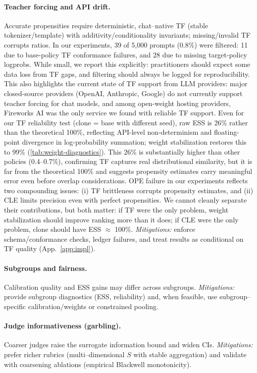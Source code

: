 \paragraph{Teacher forcing and API drift.}
Accurate propensities require deterministic, chat–native TF (stable tokenizer/template) with additivity/conditionality invariants; missing/invalid TF corrupts ratios.
In our experiments, 39 of 5,000 prompts (0.8\%) were filtered: 11 due to base-policy TF conformance failures, and 28 due to missing target-policy logprobs. While small, we report this explicitly: practitioners should expect some data loss from TF gaps, and filtering should always be logged for reproducibility. This also highlights the current state of TF support from LLM providers: major closed-source providers (OpenAI, Anthropic, Google) do not currently support teacher forcing for chat models, and among open-weight hosting providers, Fireworks AI was the only service we found with reliable TF support.
Even for our TF reliability test (clone = base with different seed), raw ESS is 26\% rather than the theoretical 100\%, reflecting API-level non-determinism and floating-point divergence in log-probability summation; weight stabilization restores this to 99\% (\cref{tab:weight-diagnostics}). This 26\% is substantially higher than other policies (0.4--0.7\%), confirming TF captures real distributional similarity, but it is far from the theoretical 100\% and suggests propensity estimates carry meaningful error even before overlap considerations.
OPE failure in our experiments reflects two compounding issues: (i) TF brittleness corrupts propensity estimates, and (ii) CLE limits precision even with perfect propensities. We cannot cleanly separate their contributions, but both matter: if TF were the only problem, weight stabilization should improve ranking more than it does; if CLE were the only problem, clone should have ESS $\approx$ 100\%.
\emph{Mitigations:} enforce schema/conformance checks, ledger failures, and treat results as conditional on TF quality (App.~\ref{app:impl}).

\paragraph{Subgroups and fairness.}
Calibration quality and ESS gains may differ across subgroups.
\emph{Mitigations:} provide subgroup diagnostics (ESS, reliability) and, when feasible, use subgroup–specific calibration/weights or constrained pooling.

\paragraph{Judge informativeness (garbling).}
Coarser judges raise the surrogate information bound and widen CIs.
\emph{Mitigations:} prefer richer rubrics (multi–dimensional $S$ with stable aggregation) and validate with coarsening ablations (empirical Blackwell monotonicity).

